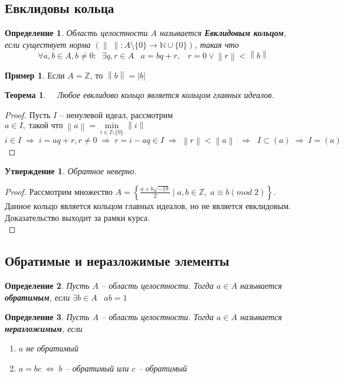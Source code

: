 \documentclass[12pt, a4paper]{article}
\newcommand{\nat}{\mathds{N}}
\newcommand{\lra}{\Leftrightarrow}
\newcommand{\ra}{\;\Rightarrow\;}
\newcommand{\Z}{\mathds{Z}}
\newcommand{\norm}[1]{\left \lVert #1 \right \rVert}
\theoremstyle{plain}
\newtheorem*{Th*}{Теорема}
\newtheorem{Def}{Определение}
\newtheorem*{Statement*}{Утверждение}
\theoremstyle{definition}
\newtheorem*{Example*}{Пример}
\begin{document}
\subsection*{Евклидовы кольца}
\begin{Def}
    Область целостности $A$ называется \textbf{Евклидовым кольцом}, если существует норма $(\norm{\;}:A\setminus \{0\}\to \nat\cup\{0\})$, такая что
\[\forall a,b \in A, b\neq 0: \;\; \exists q,r\in A\;\;\; a = bq+r, \;\;\; r = 0\vee \norm{r}<\norm{b}\]
\end{Def}
\begin{Example*}
    Если $A = \Z$, то $\norm{b} = |b|$
\end{Example*}
\begin{Th*}~\
    Любое евклидово кольцо является кольцом главных идеалов.
\end{Th*}
\begin{proof}
    Пусть $I$ -- ненулевой идеал, рассмотрим $a \in I,\;\text{такой что}\; \norm{a} = \min\limits_{i\in I\setminus \{0\}}\norm{i}$\\
    $i\in I\ra i = aq+r, r\neq 0\ra r = i-aq\in I\ra\norm{r}<\norm{a}\; \ra \; I\subset (a)\ra I=(a)$\\
\end{proof}
\begin{Statement*}
    Обратное неверно.
\end{Statement*}
\begin{proof}
    Рассмотрим множество $A = \left\{\frac{a+b\sqrt{-19}}{2}\;|\; a,b\in \Z,\; a\equiv b(mod\; 2)\right\}$. Данное кольцо является кольцом главных идеалов, но не является евклидовым. Доказательство выходит за рамки курса.\\
\end{proof}
\subsection*{Обратимые и неразложимые элементы}
\begin{Def}
    Пусть $A$ -- область целостности. Тогда $a\in A$ называется \textbf{обратимым}, если $\exists b\in A\;\;\; ab=1$
\end{Def}
\begin{Def}
    Пусть $A$ -- область целостности. Тогда $a\in A$ называется \textbf{неразложимым}, если 
    \begin{enumerate}
        \item $a$ не обратимый
        \item $a = bc \;\lra\;b$ -- обратимый или $c$ -- обратимый
    \end{enumerate}
    
\end{Def}
\end{document}
